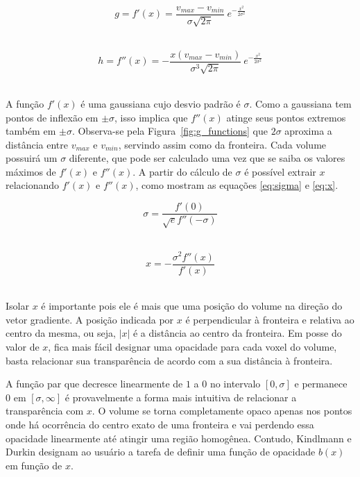 \begin{equation} \label{eq:first}
	g = f'(x) = \frac{v_{max} - v_{min}}{\sigma\sqrt{2\pi}}\ e^{-\frac{x^{2}}{2\sigma^{2}}}
\end{equation} \

\begin{equation} \label{eq:second}
	h = f''(x) = -\frac{x(v_{max} - v_{min})}{\sigma^{3}\sqrt{2\pi}}\ e^{-\frac{x^{2}}{2\sigma^{2}}}
\end{equation} \

	A função $f'(x)$ é uma gaussiana cujo desvio padrão é $\sigma$. Como a gaussiana tem pontos de inflexão em $\pm\sigma$, isso implica que $f''(x)$ atinge seus pontos extremos também em $\pm\sigma$. Observa-se pela Figura~\ref{fig:g_functions} que $2\sigma$ aproxima a distância entre $v_{max}$ e $v_{min}$, servindo assim como  da fronteira. Cada volume possuirá um $\sigma$ diferente, que pode ser calculado uma vez que se saiba os valores máximos de $f'(x)$ e $f''(x)$. A partir do cálculo de $\sigma$ é possível extrair $x$ relacionando $f'(x)$ e $f''(x)$, como mostram as equações \eqref{eq:sigma} e \eqref{eq:x}.
	
\begin{equation} \label{eq:sigma}
	\sigma = \frac{f'(0)}{\sqrt{e}f''(-\sigma)}
\end{equation} \

\begin{equation} \label{eq:x}
	x = -\frac{\sigma^{2}f''(x)}{f'(x)}
\end{equation} \

	Isolar $x$ é importante pois ele é mais que uma posição do volume na direção do vetor gradiente. A posição indicada por $x$ é perpendicular à fronteira e relativa ao centro da mesma, ou seja, $|x|$ é a distância ao centro da fronteira. Em posse do valor de $ x $, fica mais fácil designar uma opacidade para cada voxel do volume, basta relacionar sua transparência de acordo com a sua distância à fronteira.
	
	A função par que decresce linearmente de $1$ a $0$ no intervalo $[0,\sigma]$ e permanece $0$ em $[\sigma, \infty]$ é provavelmente a forma mais intuitiva de relacionar a transparência com $x$. O volume se torna completamente opaco apenas nos pontos onde há ocorrência do centro exato de uma fronteira e vai perdendo essa opacidade linearmente até atingir uma região homogênea. Contudo, Kindlmann e Durkin designam ao usuário a tarefa de definir uma função de opacidade $ b(x) $ em função de $ x $.
	
